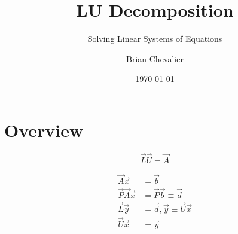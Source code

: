 \documentclass{../../KDHnotes}
\title{LU Decomposition}
\subtitle{Solving Linear Systems of Equations}
\author{Brian Chevalier}
\date{\today}
\begin{document}
 
\maketitle

\section{Overview}

\begin{equation}
	\vec{L} \vec{U} = \vec{A}
\end{equation}


\begin{align}
	\vec{A} \vec{x} &= \vec{b} \\
	\vec{P} \vec{A} \vec{x} &= \vec{P} \vec{b} \equiv \vec{d}\\
	\vec{L} \vec{y} &= \vec{d}, \vec{y} \equiv \vec{U} \vec{x}\\
	\vec{U} \vec{x} &= \vec{y}
\end{align}





\nocite{NumMethods}
\nocite{holisticnumericalmethods}

\newpage



\end{document}
